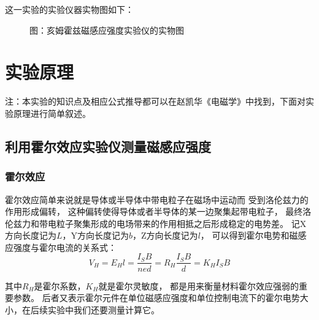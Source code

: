 \documentclass[11pt]{article}
\renewcommand{\emph}[1]{\begin{kaishu}#1\end{kaishu}}
\begin{document}
	这一实验的实验仪器实物图如下：
	\begin{figure}[H]
		\centering
		\emph{}
		\hspace{0.5in}
		\emph{}
		\hspace{0.5in}
		\bf\emph{\caption*{图：亥姆霍兹磁感应强度实验仪的实物图}}
	\end{figure}























\section{实验原理}
\begin{kaishu}
	注：本实验的知识点及相应公式推导都可以在赵凯华《电磁学》中找到，下面对实验原理进行简单叙述。
\end{kaishu}

\subsection{利用霍尔效应实验仪测量磁感应强度}

	\subsubsection{霍尔效应}
	霍尔效应简单来说就是导体或半导体中带电粒子在磁场中运动而
	受到洛伦兹力的作用形成偏转，
	这种偏转使得导体或者半导体的某一边聚集起带电粒子，
	最终洛伦兹力和带电粒子聚集形成的电场带来的作用相抵之后形成稳定的电势差。
	记X方向长度记为$L$，Y方向长度记为$b$，Z方向长度记为$l$，
	可以得到霍尔电势和磁感应强度与霍尔电流的关系式：
	\begin{equation*}
		V_H=E_Hl=\frac{I_SB}{ned}=R_H\frac{I_SB}{d}=K_HI_SB
	\end{equation*}
	
	其中$R_H$是霍尔系数，$K_H$就是霍尔灵敏度，
	都是用来衡量材料霍尔效应强弱的重要参数。
	后者又表示霍尔元件在单位磁感应强度和单位控制电流下的霍尔电势大小，在后续实验中我们还要测量计算它。
	
\end{document}
